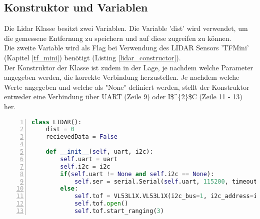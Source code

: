 \subsection{Konstruktor und Variablen}
Die Lidar Klasse besitzt zwei Variablen. Die Variable 'dist' wird verwendet, um die gemessene Entfernung zu speichern und auf diese zugreifen zu können.\\
Die zweite Variable wird als Flag bei Verwendung des \ac{LIDAR} Sensors 'TFMini' (Kapitel \ref{tf_mini}) benötigt (Listing \ref{lidar_constructor}).\\
Der Konstruktor der Klasse ist zudem in der Lage, je nachdem welche Parameter angegeben werden, die korrekte Verbindung herzustellen. Je nachdem welche Werte angegeben und welche als "None"  definiert werden, stellt der Konstruktor entweder eine Verbindung über \ac{UART} (Zeile 9) oder \ac{I$^{2}$C} (Zeile 11 - 13) her. 
\begin{lstlisting}[caption={Kostruktor der Lidar Klasse}, language={Python}, label={lidar_constructor}, numbers=left]
class LIDAR():
    dist = 0
    recievedData = False

    def __init__(self, uart, i2c):
        self.uart = uart
        self.i2c = i2c
        if(self.uart != None and self.i2c == None):
            self.ser = serial.Serial(self.uart, 115200, timeout=1)
        else:
            self.tof = VL53L1X.VL53L1X(i2c_bus=1, i2c_address=i2c)
            self.tof.open()
            self.tof.start_ranging(3)
\end{lstlisting}
